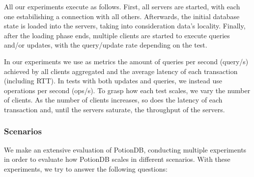 \documentclass{vldb}
\begin{document}
All our experiments execute as follows.
First, all servers are started, with each one estabilishing a connection with all others.
Afterwards, the initial database state is loaded into the servers, taking into consideration data’s locality.
Finally, after the loading phase ends, 
multiple clients are started to execute queries and/or updates, with the query/update rate depending on the test.

In our experiments we use as metrics the amount of queries per second (query/s) achieved by all clients aggregated and the average latency of each transaction (including RTT).
In tests with both updates and queries, we instead use operations per second (ops/s).
To grasp how each test scales, we vary the number of clients.
As the number of clients increases, so does the latency of each transaction and, until the servers saturate, the throughput of the servers.

\subsubsection{Scenarios}

We make an extensive evaluation of PotionDB, conducting multiple experiments in order to evaluate how PotionDB scales in different scenarios. %
With these experiments, we try to answer the following questions:
\end{document}
